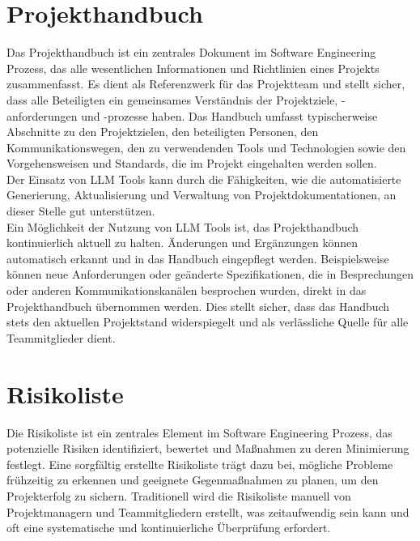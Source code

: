 \section{Projekthandbuch}  \label{Projekthandbuch}

Das Projekthandbuch ist ein zentrales Dokument im Software Engineering Prozess, das alle wesentlichen Informationen und 
Richtlinien eines Projekts zusammenfasst. Es dient als Referenzwerk für das Projektteam und stellt sicher, dass alle 
Beteiligten ein gemeinsames Verständnis der Projektziele, -anforderungen und -prozesse haben. Das Handbuch umfasst 
typischerweise Abschnitte zu den Projektzielen, den beteiligten Personen, den Kommunikationswegen, den zu verwendenden 
Tools und Technologien sowie den Vorgehensweisen und Standards, die im Projekt eingehalten werden sollen.\\

Der Einsatz von LLM Tools kann durch die Fähigkeiten, wie die automatisierte Generierung, Aktualisierung 
und Verwaltung von Projektdokumentationen, an dieser Stelle gut unterstützen.\\

Ein Möglichkeit der Nutzung von LLM Tools ist, das Projekthandbuch kontinuierlich aktuell zu 
halten. Änderungen und Ergänzungen können automatisch erkannt und in das Handbuch eingepflegt werden. Beispielsweise 
können neue Anforderungen oder geänderte Spezifikationen, die in Besprechungen oder anderen Kommunikationskanälen 
besprochen wurden, direkt in das Projekthandbuch übernommen werden. Dies stellt sicher, dass das Handbuch stets den 
aktuellen Projektstand widerspiegelt und als verlässliche Quelle für alle Teammitglieder dient.

\section{Risikoliste}  \label{Risikoliste}

Die Risikoliste ist ein zentrales Element im Software Engineering Prozess, das potenzielle Risiken identifiziert, 
bewertet und Maßnahmen zu deren Minimierung festlegt. Eine sorgfältig erstellte Risikoliste trägt dazu bei, mögliche 
Probleme frühzeitig zu erkennen und geeignete Gegenmaßnahmen zu planen, um den Projekterfolg zu sichern. Traditionell 
wird die Risikoliste manuell von Projektmanagern und Teammitgliedern erstellt, was zeitaufwendig sein kann und oft 
eine systematische und kontinuierliche Überprüfung erfordert.\\

